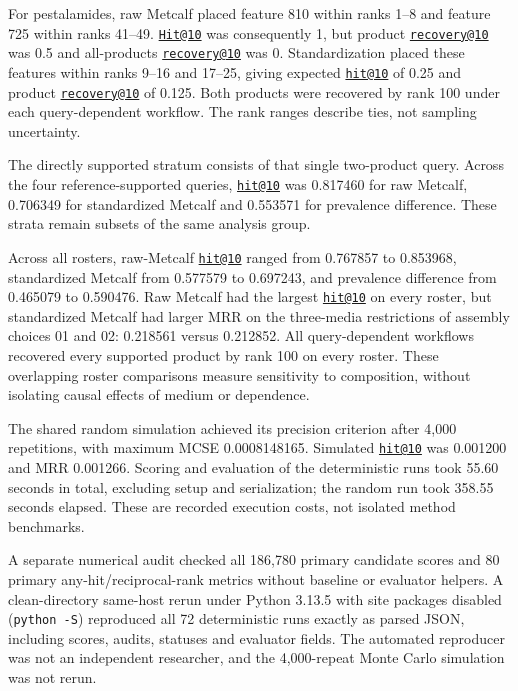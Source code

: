 \documentclass[
  10pt,
  a4paper,
]{article}
\begin{document}
For pestalamides, raw Metcalf placed feature 810 within ranks 1--8 and feature 725 within ranks 41--49. \href{mailto:Hit@10}{\nolinkurl{Hit@10}} was consequently 1, but product \href{mailto:recovery@10}{\nolinkurl{recovery@10}} was 0.5 and all-products \href{mailto:recovery@10}{\nolinkurl{recovery@10}} was 0. Standardization placed these features within ranks 9--16 and 17--25, giving expected \href{mailto:hit@10}{\nolinkurl{hit@10}} of 0.25 and product \href{mailto:recovery@10}{\nolinkurl{recovery@10}} of 0.125. Both products were recovered by rank 100 under each query-dependent workflow. The rank ranges describe ties, not sampling uncertainty.

The directly supported stratum consists of that single two-product query. Across the four reference-supported queries, \href{mailto:hit@10}{\nolinkurl{hit@10}} was 0.817460 for raw Metcalf, 0.706349 for standardized Metcalf and 0.553571 for prevalence difference. These strata remain subsets of the same analysis group.

Across all rosters, raw-Metcalf \href{mailto:hit@10}{\nolinkurl{hit@10}} ranged from 0.767857 to 0.853968, standardized Metcalf from 0.577579 to 0.697243, and prevalence difference from 0.465079 to 0.590476. Raw Metcalf had the largest \href{mailto:hit@10}{\nolinkurl{hit@10}} on every roster, but standardized Metcalf had larger MRR on the three-media restrictions of assembly choices 01 and 02: 0.218561 versus 0.212852. All query-dependent workflows recovered every supported product by rank 100 on every roster. These overlapping roster comparisons measure sensitivity to composition, without isolating causal effects of medium or dependence.

The shared random simulation achieved its precision criterion after 4,000 repetitions, with maximum MCSE 0.0008148165. Simulated \href{mailto:hit@10}{\nolinkurl{hit@10}} was 0.001200 and MRR 0.001266. Scoring and evaluation of the deterministic runs took 55.60 seconds in total, excluding setup and serialization; the random run took 358.55 seconds elapsed. These are recorded execution costs, not isolated method benchmarks.

A separate numerical audit checked all 186,780 primary candidate scores and 80 primary any-hit/reciprocal-rank metrics without baseline or evaluator helpers. A clean-directory same-host rerun under Python 3.13.5 with site packages disabled (\texttt{python\ -S}) reproduced all 72 deterministic runs exactly as parsed JSON, including scores, audits, statuses and evaluator fields. The automated reproducer was not an independent researcher, and the 4,000-repeat Monte Carlo simulation was not rerun.
\end{document}
